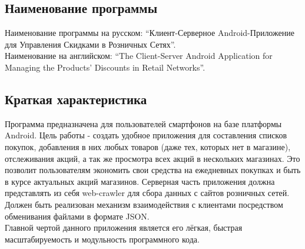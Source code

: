 \subsection{Наименование программы}
Наименование программы на русском:
``Клиент-Серверное Android-Приложение для Управления Скидками в Розничных Сетях''. \\
Наименование на английском:
``The Client-Server Android Application for Managing the Products' Discounts in Retail Networks''. \\


\subsection{Краткая характеристика}
Программа предназначена для пользователей смартфонов на базе платформы Android.
Цель работы - создать удобное приложения для составления списков покупок,
добавления в них любых товаров (даже тех, которых нет в магазине), отслеживания
акций, а так же просмотра всех акций в нескольких магазинах. Это позволит
пользователям экономить свои средства на ежедневных покупках и быть в курсе
актуальных акций магазинов.  Серверная часть приложения должна представлять из
себя web-crawler для сбора данных с сайтов розничных сетей. Должен быть
реализован механизм взаимодействия с клиентами посредством обменивания файлами
в формате JSON.\\
Главной чертой данного приложения является его лёгкая, быстрая масштабируемость
и модульность программного кода.

